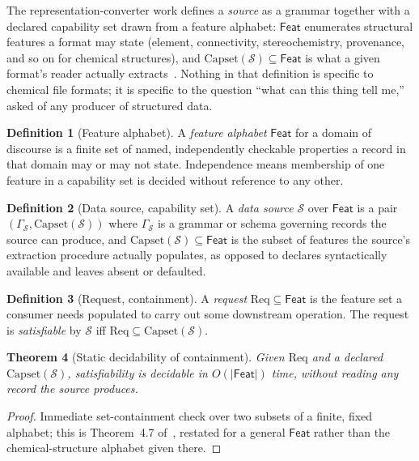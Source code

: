 \documentclass[11pt,a4paper,twocolumn]{article}
\newtheorem{theorem}{Theorem}
\theoremstyle{definition}
\newtheorem{definition}[theorem]{Definition}
\theoremstyle{remark}
\newcommand{\Feat}{\mathsf{Feat}}
\newcommand{\Capset}{\mathrm{Capset}}
\newcommand{\Src}{\mathcal{S}}
\newcommand{\Req}{\mathrm{Req}}
\begin{document}
The representation-converter work defines a \emph{source} as a grammar together
with a declared capability set drawn from a feature alphabet: $\Feat$ enumerates
structural features a format may state (element, connectivity, stereochemistry,
provenance, and so on for chemical structures), and $\Capset(\Src)\subseteq\Feat$
is what a given format's reader actually extracts~\cite{masamune}. Nothing in
that definition is specific to chemical file formats; it is specific to the
question ``what can this thing tell me,'' asked of any producer of structured
data.

\begin{definition}[Feature alphabet]
\label{def:feat}
A \emph{feature alphabet} $\Feat$ for a domain of discourse is a finite set of
named, independently checkable properties a record in that domain may or may not
state. Independence means membership of one feature in a capability set is
decided without reference to any other.
\end{definition}

\begin{definition}[Data source, capability set]
\label{def:source}
A \emph{data source} $\Src$ over $\Feat$ is a pair $(\Gamma_\Src, \Capset(\Src))$
where $\Gamma_\Src$ is a grammar or schema governing records the source can
produce, and $\Capset(\Src)\subseteq\Feat$ is the subset of features the source's
extraction procedure actually populates, as opposed to declares syntactically
available and leaves absent or defaulted.
\end{definition}

\begin{definition}[Request, containment]
\label{def:request}
A \emph{request} $\Req\subseteq\Feat$ is the feature set a consumer needs
populated to carry out some downstream operation. The request is
\emph{satisfiable} by $\Src$ iff $\Req\subseteq\Capset(\Src)$.
\end{definition}

\begin{theorem}[Static decidability of containment]
\label{thm:decidable}
Given $\Req$ and a declared $\Capset(\Src)$, satisfiability is decidable in
$O(|\Feat|)$ time, without reading any record the source produces.
\end{theorem}

\begin{proof}
Immediate set-containment check over two subsets of a finite, fixed alphabet;
this is Theorem~4.7 of~\cite{masamune}, restated for a general $\Feat$ rather
than the chemical-structure alphabet given there.
\end{proof}
\end{document}
